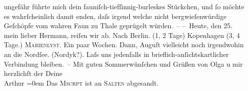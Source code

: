 \begin{ledgroupsized}[t]{13cm}
               ungefähr führte mich dein fauniſch-tiefſinnig-burleskes Stückchen, und ſo möchte es wahrſcheinlich damit {\pb}enden, daſs irgend
               welche nicht bergwieſenwürdige Geſchöpfe vom wahren Faun zu Thale geprügelt
               würden. –\pend
           \pstart
           \noindent{}– Heute, \introOben{}den 25.\introOben{} mein lieber Hermann, reiſen wir ab. Nach
                  Berlin. (1, 2 Tage) Kopenhagen (3, 4 Tage.) \textsc{Marienlyst}. Ein paar Wochen. Dann, Auguſt vielleicht noch irgendwohin an die Nordſee. (Nordyk?). Laſs
               uns jedenfalls in brieflich-anſichtskartlicher Verbindung bleiben. – \pend
           \pstart
           Mit guten Sommerwünſchen und {\pb}Grüßen von Olga u mir{\\[\baselineskip]}herzlichſt der Deine{\\[\baselineskip]}\spacefill\mbox{Arthur}\pend
           \leftskip=0em{}\pstart
           \noindent{}Das \textsc{Mscrpt} ist an \textsc{Salten} abgesandt.\pend
           
         
         \endnumbering{}\end{ledgroupsized}  \newcommand{\dateiname}{L01604}\newcommand{\titel}{Arthur Schnitzler an Hermann Bahr, 24.–25. 6. 1906}\newcommand{\editorInnen}{ Kurt Ifkovits,  Martin Anton Müller}
      